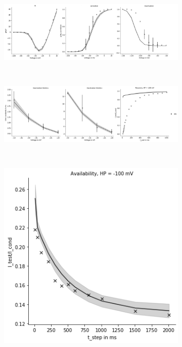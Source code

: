 \documentclass[11pt]{report}
\begin{document}
\begin{figure}[H]
    \centering
    \captionsetup{singlelinecheck = false, format= hang, justification=centerlast, font=footnotesize, labelsep=space}
    \begin{subfigure}[b]{\textwidth}
    \centering
        \includegraphics[width=\linewidth]{figures/Ina_Simple_saka/ina_simple_exp_iv_act_inact_all_saka_pop_10000.png}
    \end{subfigure}
    ~
    \begin{subfigure}[b]{\textwidth}
    \centering
        \includegraphics[width=\linewidth]{figures/Ina_Simple_saka/ina_simple_exp_inact_kin_recov_all_saka_pop_10000.png}
    \end{subfigure}
    ~
    \begin{subfigure}[b]{0.34\textwidth}
    \centering
        \includegraphics[width=\linewidth]{figures/Ina_Simple_saka/ina_simple_exp_availability_all_saka_pop_10000.png}

\end{subfigure}
\end{figure}
\end{document}
